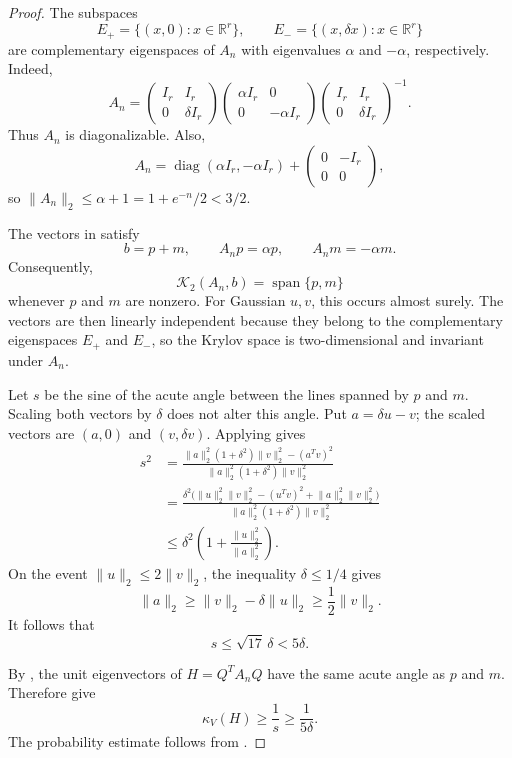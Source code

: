 \documentclass[11pt]{article}
\begin{document}
\begin{proof}
The subspaces
\[
  E_+=\{(x,0):x\in\mathbb R^r\},
  \qquad
  E_-=\{(x,\delta x):x\in\mathbb R^r\}
\]
are complementary eigenspaces of $A_n$ with eigenvalues $\alpha$ and
$-\alpha$, respectively.  Indeed,
\[
  A_n=
  \begin{pmatrix}I_r&I_r\\0&\delta I_r\end{pmatrix}
  \begin{pmatrix}\alpha I_r&0\\0&-\alpha I_r\end{pmatrix}
  \begin{pmatrix}I_r&I_r\\0&\delta I_r\end{pmatrix}^{-1}.
\]
Thus $A_n$ is diagonalizable.  Also,
\[
  A_n=\operatorname{diag}(\alpha I_r,-\alpha I_r)
  +\begin{pmatrix}0&-I_r\\0&0\end{pmatrix},
\]
so $\lVert A_n\rVert_2\leq\alpha+1=1+e^{-n}/2<3/2$.

The vectors in  satisfy
\[
  b=p+m,\qquad A_np=\alpha p,\qquad A_nm=-\alpha m.
\]
Consequently,
\begin{equation}
  \mathcal K_2(A_n,b)=\operatorname{span}\{p,m\}
  \label{eq:krylov-spectral-span}
\end{equation}
whenever $p$ and $m$ are nonzero.  For Gaussian $u,v$, this occurs almost
surely.  The vectors are then linearly independent because they belong to the
complementary eigenspaces $E_+$ and $E_-$, so the Krylov space is
two-dimensional and invariant under $A_n$.

Let $s$ be the sine of the acute angle between the lines spanned by $p$ and
$m$.  Scaling both vectors by $\delta$ does not alter this angle.  Put
$a=\delta u-v$; the scaled vectors are $(a,0)$ and $(v,\delta v)$.  Applying
 gives
\begin{align*}
  s^2
  &=\frac{\lVert a\rVert_2^2(1+\delta^2)\lVert v\rVert_2^2-(a^Tv)^2}
  {\lVert a\rVert_2^2(1+\delta^2)\lVert v\rVert_2^2}\\
  &=\frac{\delta^2\bigl(
  \lVert u\rVert_2^2\lVert v\rVert_2^2-(u^Tv)^2
  +\lVert a\rVert_2^2\lVert v\rVert_2^2\bigr)}
  {\lVert a\rVert_2^2(1+\delta^2)\lVert v\rVert_2^2}\\
  &\leq\delta^2\left(1+
  \frac{\lVert u\rVert_2^2}{\lVert a\rVert_2^2}\right).
\end{align*}
On the event $\lVert u\rVert_2\leq2\lVert v\rVert_2$, the inequality
$\delta\leq1/4$ gives
\[
  \lVert a\rVert_2
  \geq\lVert v\rVert_2-\delta\lVert u\rVert_2
  \geq\frac12\lVert v\rVert_2.
\]
It follows that
\begin{equation}
  s\leq\sqrt{17}\,\delta<5\delta.
  \label{eq:small-angle}
\end{equation}

By , the unit eigenvectors of
$H=Q^TA_nQ$ have the same acute angle as $p$ and $m$.  Therefore
 give
\[
  \kappa_V(H)\geq\frac1s\geq\frac1{5\delta}.
\]
The probability estimate follows from
.
\end{proof}
\end{document}
